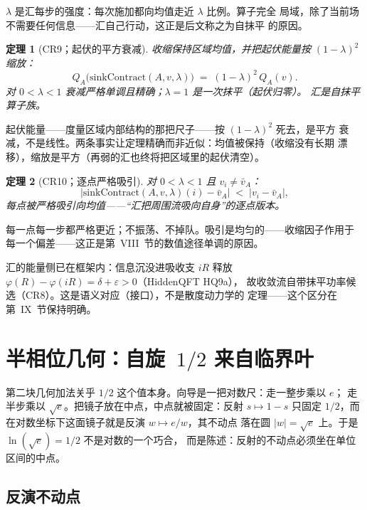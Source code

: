 \documentclass[aps,prd,preprint,superscriptaddress,amsmath,amssymb]{revtex4-2}
\newtheorem{theorem}{定理}[section]
\begin{document}
$\lambda$ 是汇每步的强度：每次施加都向均值走近 $\lambda$ 比例。算子完全
局域，除了当前场不需要任何信息——汇自己行动，这正是后文称之为自抹平
的原因。

\begin{theorem}[CR9；起伏的平方衰减]
\label{thm:cr9}
收缩保持区域均值，并把起伏能量按 $(1-\lambda)^2$ 缩放：
\begin{equation}
\label{eq:cr9}
Q_A\bigl(\text{sinkContract}(A,v,\lambda)\bigr)
\;=\;(1-\lambda)^2\,Q_A(v).
\end{equation}
对 $0<\lambda<1$ 衰减严格单调且精确；$\lambda=1$ 是一次抹平（起伏归零）。
汇是自抹平算子族。
\end{theorem}

起伏能量——度量区域内部结构的那把尺子——按 $(1-\lambda)^2$ 死去，是平方
衰减，不是线性。两条事实让定理精确而非近似：均值被保持（收缩没有长期
漂移），缩放是平方（再弱的汇也终将把区域里的起伏清空）。

\begin{theorem}[CR10；逐点严格吸引]
\label{thm:cr10}
对 $0<\lambda<1$ 且 $v_i\neq\bar v_A$：
\[
\bigl|\text{sinkContract}(A,v,\lambda)(i)-\bar v_A\bigr|
\;<\;\bigl|v_i-\bar v_A\bigr| ,
\]
每点被严格吸引向均值——``汇把周围流吸向自身''的逐点版本。
\end{theorem}

每一点每一步都严格更近；不振荡、不掉队。吸引是均匀的——收缩因子作用于
每一个偏差——这正是第~VIII~节的数值途径单调的原因。

汇的能量侧已在框架内：信息沉没进吸收支 $iR$ 释放
$\varphi(R)-\varphi(iR)=\delta+\varepsilon>0$（HiddenQFT HQ9a），
故收敛流自带抹平功率候选（CR8）。这是语义对应（接口），不是散度动力学的
定理——这个区分在第~IX~节保持明确。

\section{半相位几何：自旋~$1/2$ 来自临界叶}
\label{sec:halfphase}

第二块几何加法关乎 $1/2$ 这个值本身。向导是一把对数尺：走一整步乘以 $e$；
走半步乘以 $\sqrt e$。把镜子放在中点，中点就被固定：反射 $s\mapsto 1-s$
只固定 $1/2$，而在对数坐标下这面镜子就是反演 $w\mapsto e/w$，其不动点
落在圆 $|w|=\sqrt e$ 上。于是 $\ln(\sqrt e)=1/2$ 不是对数的一个巧合，
而是陈述：反射的不动点必须坐在单位区间的中点。

\subsection{反演不动点}
\end{document}
